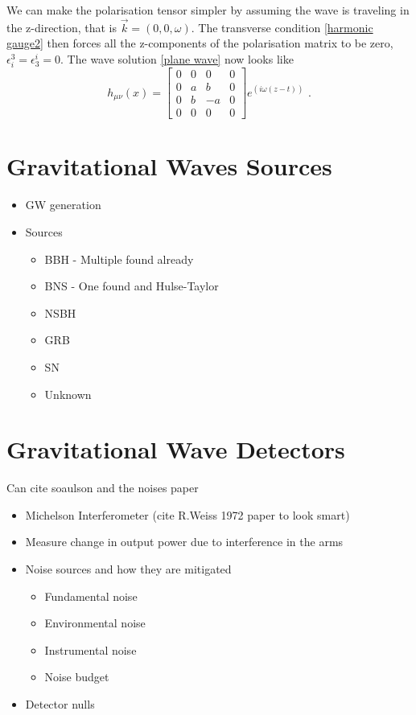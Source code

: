 \documentclass[11pt]{cuthesis}
\newcommand{\mn}{_{\mu\nu}}
\newcommand{\fs}{\text{ .}}
\begin{document}
We can make the polarisation tensor simpler by assuming the wave is traveling in the z-direction, that is $\vec{k} = (0,0,\omega)$. The transverse condition \ref{harmonic gauge2} then forces all the z-components of the polarisation matrix to be zero, $\epsilon^3_i = \epsilon^i_3 = 0$. The wave solution \ref{plane wave} now looks like
\[
h\mn (x)
=
\begin{bmatrix}
0 & 0 & 0 & 0 \\
0 & a & b & 0 \\
0 & b & -a & 0 \\
0 & 0 & 0 & 0 
\end{bmatrix}
e^{(i\omega (z-t))} \fs
\] 

\newpage
\section{Gravitational Waves Sources} 
\begin{itemize}
\item GW generation 
\item Sources
\begin{itemize}
\item BBH - Multiple found already
\item BNS - One found and Hulse-Taylor
\item NSBH
\item GRB 
\item SN
\item Unknown
\end{itemize}
\end{itemize}
\section{Gravitational Wave Detectors} \label{sec:gw detectors}
Can cite soaulson and the noises paper
\begin{itemize}
\item Michelson Interferometer (cite R.Weiss 1972 paper to look smart)
\item Measure change in output power due to interference in the arms
\item Noise sources and how they are mitigated
\begin{itemize}
\item Fundamental noise
\item Environmental noise
\item Instrumental noise
\item Noise budget
\end{itemize}
\item Detector nulls
\end{itemize}
\end{document}

